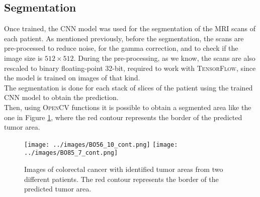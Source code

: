 \documentclass{standalone}
\begin{document}
\subsection{Segmentation}
Once trained, the CNN model was used for the segmentation of the MRI scans of each patient.
As mentioned previously, before the segmentation, the scans are pre-processed to reduce noise, for the gamma correction, and to check if the image size is $512 \times 512$.
During the pre-processing, as we know, the scans are also rescaled to binary floating-point 32-bit, required to work with \textsc{TensorFlow}, since the model is trained on images of that kind.
\\
The segmentation is done for each stack of slices of the patient using the trained CNN model to obtain the prediction.
\\
Then, using \textsc{OpenCV}\cite{opencv_library} functions it is possible to obtain a segmented area like the one in Figure \ref{contoured}, where the red contour represents the border of the predicted tumor area.


\begin{figure}[htp]

    \centering
    \texttt{[image: ../images/BO56\_10\_cont.png]}
    \texttt{[image: ../images/BO85\_7\_cont.png]}
    
    \caption{Images of colorectal cancer with identified tumor areas from two different patients. The red contour represents the border of the predicted tumor area.}
    \label{contoured}
    
    \end{figure}
\end{document}
